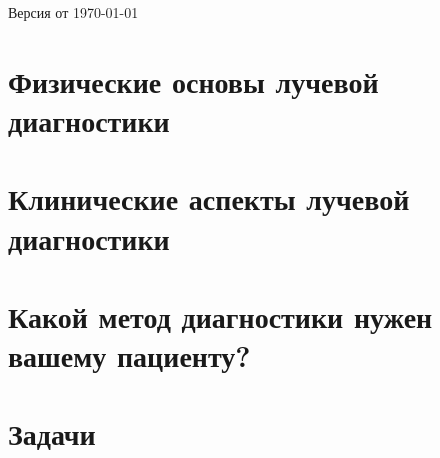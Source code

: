 \documentclass[a4paper,12pt]{report}
\begin{document}

Версия от \today

\chapter{Физические основы лучевой диагностики} %







\chapter{Клинические аспекты лучевой диагностики} %



\chapter{Какой метод диагностики нужен вашему пациенту?} %


\chapter{Задачи}


\end{document}
